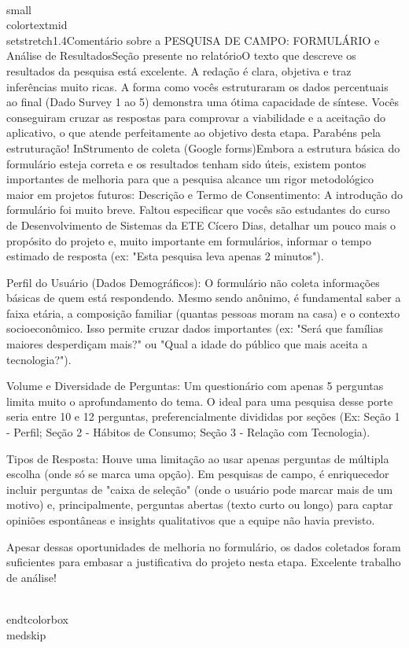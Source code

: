 \documentclass[11pt, a4paper]{article}
\begin{document}
{\\small\\color{textmid}\\setstretch{1.4}Comentário sobre a PESQUISA DE CAMPO: FORMULÁRIO e Análise de ResultadosSeção presente no relatórioO texto que descreve os resultados da pesquisa está excelente. A redação é clara, objetiva e traz inferências muito ricas. A forma como vocês estruturaram os dados percentuais ao final (Dado Survey 1 ao 5) demonstra uma ótima capacidade de síntese. Vocês conseguiram cruzar as respostas para comprovar a viabilidade e a aceitação do aplicativo, o que atende perfeitamente ao objetivo desta etapa. Parabéns pela estruturação!
InStrumento de coleta (Google forms)Embora a estrutura básica do formulário esteja correta e os resultados tenham sido úteis, existem pontos importantes de melhoria para que a pesquisa alcance um rigor metodológico maior em projetos futuros:
Descrição e Termo de Consentimento: A introdução do formulário foi muito breve. Faltou especificar que vocês são estudantes do curso de Desenvolvimento de Sistemas da ETE Cícero Dias, detalhar um pouco mais o propósito do projeto e, muito importante em formulários, informar o tempo estimado de resposta (ex: "Esta pesquisa leva apenas 2 minutos").

Perfil do Usuário (Dados Demográficos): O formulário não coleta informações básicas de quem está respondendo. Mesmo sendo anônimo, é fundamental saber a faixa etária, a composição familiar (quantas pessoas moram na casa) e o contexto socioeconômico. Isso permite cruzar dados importantes (ex: "Será que famílias maiores desperdiçam mais?" ou "Qual a idade do público que mais aceita a tecnologia?").

Volume e Diversidade de Perguntas: Um questionário com apenas 5 perguntas limita muito o aprofundamento do tema. O ideal para uma pesquisa desse porte seria entre 10 e 12 perguntas, preferencialmente divididas por seções (Ex: Seção 1 - Perfil; Seção 2 - Hábitos de Consumo; Seção 3 - Relação com Tecnologia).

Tipos de Resposta: Houve uma limitação ao usar apenas perguntas de múltipla escolha (onde só se marca uma opção). Em pesquisas de campo, é enriquecedor incluir perguntas de "caixa de seleção" (onde o usuário pode marcar mais de um motivo) e, principalmente, perguntas abertas (texto curto ou longo) para captar opiniões espontâneas e insights qualitativos que a equipe não havia previsto.

Apesar dessas oportunidades de melhoria no formulário, os dados coletados foram suficientes para embasar a justificativa do projeto nesta etapa. Excelente trabalho de análise!}
\\end{tcolorbox}
\\medskip
\end{document}

